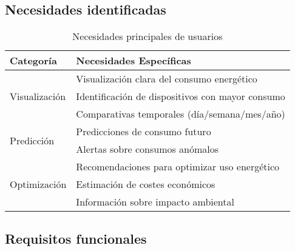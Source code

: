 \subsection{Necesidades identificadas}

\begin{table}[H]
\centering
\caption{Necesidades principales de usuarios}
\begin{tabular}{|l|l|}
\hline
\textbf{Categoría} & \textbf{Necesidades Específicas} \\
\hline
\multirow{3}{*}{Visualización} & Visualización clara del consumo energético \\
\cline{2-2}
& Identificación de dispositivos con mayor consumo \\
\cline{2-2}
& Comparativas temporales (día/semana/mes/año) \\
\hline
\multirow{2}{*}{Predicción} & Predicciones de consumo futuro \\
\cline{2-2}
& Alertas sobre consumos anómalos \\
\hline
\multirow{3}{*}{Optimización} & Recomendaciones para optimizar uso energético \\
\cline{2-2}
& Estimación de costes económicos \\
\cline{2-2}
& Información sobre impacto ambiental \\
\hline
\end{tabular}
\label{tab:necesidades_usuarios}
\end{table}

\subsection{Requisitos funcionales}

